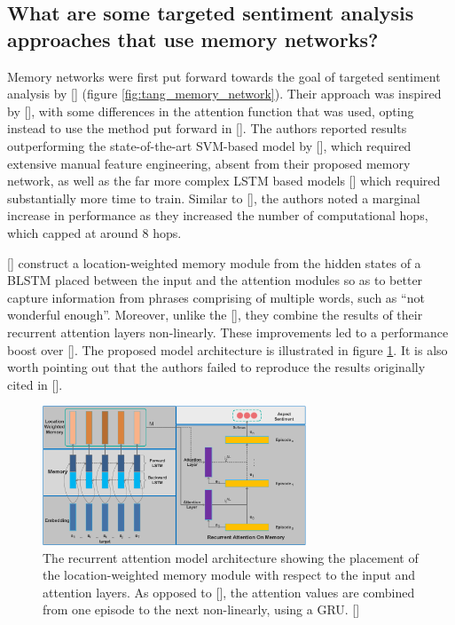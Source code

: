 \documentclass[12pt, a4paper]{report}
\theoremstyle{definition}
\theoremstyle{definition}%
\theoremstyle{definition}%
\theoremstyle{definition}%
\theoremstyle{definition}%
\theoremstyle{definition}%
\renewcommand{\cite}[1]{[\citealp{#1}]}
\begin{document}
\subsection{What are some targeted sentiment analysis approaches that use memory networks?}
Memory networks were first put forward towards the goal of targeted sentiment analysis by \cite{tang2016} (figure \ref{fig:tang_memory_network}). Their approach was inspired by \cite{sukhbaatar2015}, with some differences in the attention function that was used, opting instead to use the method put forward in \cite{bahdanau2014}. The authors reported results outperforming the state-of-the-art SVM-based model by \cite{kiritchenko}, which required extensive manual feature engineering, absent from their proposed memory network, as well as the far more complex LSTM based models \cite{tang2016} which required substantially more time to train. Similar to \cite{sukhbaatar2015}, the authors noted a marginal increase in performance as they increased the number of computational hops, which capped at around 8 hops.

\cite{chen2017} construct a location-weighted memory module from the hidden states of a BLSTM placed between the input and the attention modules so as to better capture information from phrases comprising of multiple words, such as \enquote{not wonderful enough}. Moreover, unlike the \cite{tang2016}, they combine the results of their recurrent attention layers non-linearly. These improvements led to a performance boost over \cite{tang2016}. The proposed model architecture is illustrated in figure \ref{fig:chen_recurrent_attention_model}. It is also worth pointing out that the authors failed to reproduce the results originally cited in \cite{tang2016}.

\begin{figure}[!ht]
	\centering
	\includegraphics[width=0.7\textwidth]{./figures/chen_recurrent_attention.png}
	\caption{The recurrent attention model architecture showing the placement of the location-weighted memory module with respect to the input and attention layers. As opposed to \cite{tang2016}, the attention values are combined from one episode to the next non-linearly, using a GRU. \cite{chen2017}}
	\label{fig:chen_recurrent_attention_model}
\end{figure}
\end{document}
